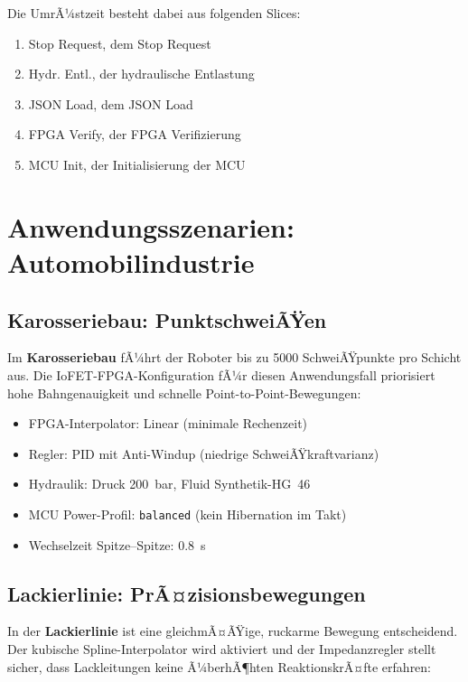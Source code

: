 ﻿\documentclass[a4paper,12pt]{scrreprt}
\theoremstyle{definition}
\begin{document}
Die UmrÃ¼stzeit besteht dabei aus folgenden Slices:
\begin{enumerate}
	\item Stop Request, dem Stop Request
	\item Hydr. Entl., der hydraulische Entlastung
	\item JSON Load, dem JSON Load
	\item FPGA Verify, der FPGA Verifizierung
	\item MCU Init, der Initialisierung der MCU
\end{enumerate}
\section{Anwendungsszenarien: Automobilindustrie}

\subsection{Karosseriebau: PunktschweiÃŸen}

Im \textbf{Karosseriebau} fÃ¼hrt der Roboter bis zu 5000 SchweiÃŸpunkte
pro Schicht aus. Die IoFET-FPGA-Konfiguration fÃ¼r diesen Anwendungsfall
priorisiert hohe Bahngenauigkeit und schnelle Point-to-Point-Bewegungen:

\begin{itemize}
  \item FPGA-Interpolator: Linear (minimale Rechenzeit)
  \item Regler: PID mit Anti-Windup (niedrige SchweiÃŸkraftvarianz)
  \item Hydraulik: Druck \SI{200}{\bar}, Fluid Synthetik-HG~46
  \item MCU Power-Profil: \texttt{balanced} (kein Hibernation im Takt)
  \item Wechselzeit Spitze--Spitze: \SI{0.8}{\second}
\end{itemize}

\subsection{Lackierlinie: PrÃ¤zisionsbewegungen}

In der \textbf{Lackierlinie} ist eine gleichmÃ¤ÃŸige, ruckarme
Bewegung entscheidend. Der kubische Spline-Interpolator wird aktiviert
und der Impedanzregler stellt sicher, dass Lackleitungen keine
Ã¼berhÃ¶hten ReaktionskrÃ¤fte erfahren:
\end{document}
